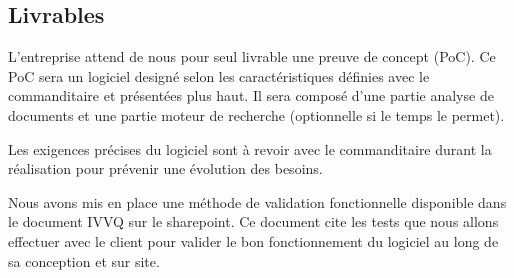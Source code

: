 \subsection{Livrables}
L'entreprise attend de nous pour seul livrable une preuve de concept (PoC).
Ce PoC sera un logiciel designé selon les caractéristiques définies avec le commanditaire et présentées plus haut.
Il sera composé d'une partie analyse de documents et une partie moteur de recherche (optionnelle si le temps le permet).

Les exigences précises du logiciel sont à revoir avec le commanditaire durant la réalisation pour prévenir une évolution des besoins.

Nous avons mis en place une méthode de validation fonctionnelle disponible dans le document IVVQ sur le sharepoint.
Ce document cite les tests que nous allons effectuer avec le client pour valider le bon fonctionnement du logiciel au long de sa conception et sur site.

